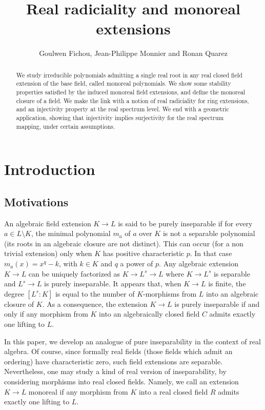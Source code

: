 \documentclass[12pt]{amsart}
\title{Real radiciality and monoreal extensions}
\author{Goulwen Fichou, Jean-Philippe Monnier and Ronan Quarez}
\theoremstyle{definition}
\newcommand{\ronan}[1]{\textcolor{blue}{#1}}
\newcommand{\jeanphi}[1]{\textcolor{green}{#1}}
\DeclareMathOperator{\Sp}{Spec}
\begin{document}
\maketitle


\begin{abstract} 
We study irreducible polynomials admitting a single real root in any real closed field extension of the base field, called monoreal polynomials. 
We show some stability properties satisfied by the induced monoreal field extensions, and define the monoreal closure of a field. We make the link with a notion of real radiciality for ring extensions, and an injectivity property  at the real spectrum level.
We end with a geometric application, showing that injectivity implies surjectivity for the real spectrum mapping, under certain assumptions.
\end{abstract}



\section*{Introduction}
\subsection*{Motivations}
An algebraic field extension $K\to L$ is said to be purely inseparable  if for every $a\in {\displaystyle L\setminus K}$, the minimal polynomial $m_a$ of $a$ over $K$ is not a separable polynomial (its roots in an algebraic closure are not distinct). This can occur (for a non trivial extension) only when $K$ has positive characteristic $p$. In that case $m_a(x)=x^q-k$, with $k\in K$ and $q$ a power of $p$.
Any algebraic extension $K\to L$ can be uniquely factorized as $K\to L^s\to L$ where $K\to L^s$ is separable and 
$L^s\to L$ is purely inseparable. It appears that, when $K\to L$ is finite, the degree $[L^s:K]$ is equal to the number of $K$-morphisms from $L$ into an algebraic closure of $K$.
As a consequence, the extension $K\to L$ is purely inseparable if and only if any morphism from $K$ into an algebraically closed field $C$ admits exactly one lifting to $L$.

In this paper, we develop an analogue of pure inseparability in the context of real algebra.
Of course, since formally real fields (those fields which admit an ordering) have characteristic zero, such field extensions are separable. Nevertheless, one may study a kind of real version of inseparability, by  considering morphisms into real closed fields. Namely, we call an extension $K\to L$ monoreal if any morphism from $K$ into a real closed field $R$ admits exactly one lifting to $L$.
\end{document}
